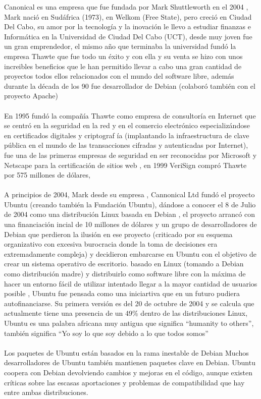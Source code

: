 \documentclass[a4paper,oneside,11pt]{article}
\begin{document}
Canonical es una empresa que fue fundada por Mark Shuttleworth en el 2004 , Mark naci\'o en Sud\'africa (1973), en Welkom (Free State), pero creci\'o en Ciudad
Del Cabo, su amor por la tecnolog\'ia y la inovaci\'on le llevo a estudiar finanzas e Inform\'atica en
la Universidad de Ciudad Del Cabo (UCT), desde muy joven fue un gran emprendedor, el mismo
año que terminaba la universidad fund\'o la empresa Thawte que fue todo un \'exito y con ella y su
venta se hizo con unos increibles beneficios que le han permitido llevar a cabo una gran cantidad de
proyectos todos ellos relacionados con el mundo del software libre, adem\'as durante la d\'ecada de los
90 fue desarrollador de Debian (colabor\'o tambi\'en con el proyecto Apache)
\\\\
En 1995 fund\'o la compañ\'ia Thawte como empresa de consultor\'ia en Internet que se centr\'o en
la seguridad en la red y en el comercio electr\'onico especializ\'andose en certificados digitales y criptograf
\'ia (implantando la infraestructura de clave p\'ublica en el mundo de las transacciones cifradas
y autenticadas por Internet), fue una de las primeras empresas de seguridad en ser reconocidas por
Microsoft y Netscape para la certificaci\'on de sitios web , en 1999 VeriSign compr\'o Thawte por 575
millones de d\'olares,
\\\\
A principios de 2004, Mark desde su empresa , Cannonical Ltd fund\'o el proyecto Ubuntu (creando
tambi\'en la Fundaci\'on Ubuntu), d\'andose a conocer el 8 de Julio de 2004 como una distribuci\'on
Linux basada en Debian , el proyecto arranc\'o con una financiaci\'on incial de 10 millones de d\'olares
y un grupo de desarrolladores de Debian que perdieron la ilusi\'on en ese proyecto (criticado por
su esquema organizativo con excesiva burocracia donde la toma de decisiones era extremadamente
compleja) y decidieron embarcarse en Ubuntu con el objetivo de crear un sistema operativo
de escritorio. basado en Linux (tomando a Debian como distribuci\'on madre) y distribuirlo como
software libre con la m\'axima de hacer un entorno f\'acil de utilizar intentado llegar a la mayor
cantidad de usuarios posible , Ubuntu fue pensada como una iniciartiva que en un futuro pudiera
autofinanciarse.
Su primera versi\'on es del 20 de octubre de 2004 y se calcula que actualmente tiene una presencia
de un 49\% dentro de las distribuciones Linux, Ubuntu es una palabra africana muy antigua
que significa ``humanity to others'', tambi\'en significa ``Yo soy lo que soy debido a lo que todos
somos''
\\\\
Los paquetes de Ubuntu est\'an basados en la rama inestable de Debian Muchos desarrolladores
de Ubuntu tambi\'en mantienen paquetes clave en Debian. Ubuntu coopera con Debian devolviendo
cambios y mejoras en el c\'odigo, aunque existen cr\'iticas sobre las escasas aportaciones y problemas
de compatibilidad que hay entre ambas distribuciones.
\end{document}
